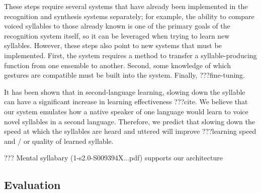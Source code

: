 These steps require several systems
that have already been implemented
in the recognition and synthesis systems separately;
for example, the ability to compare
voiced syllables to those already known
is one of the primary goals of the recognition system itself,
so it can be leveraged when trying to learn new syllables.
However, these steps also point to new systems
that must be implemented.
First, the system requires a method
to transfer a syllable-producing function
from one ensemble to another.
Second, some knowledge of which gestures
are compatible must be built into the system.
Finally, ???fine-tuning.

It has been shown that in second-language learning,
slowing down the syllable can have
a significant increase in learning effectiveness
???cite.
We believe that our system emulates
how a native speaker of one language
would learn to voice novel syllables in a second language.
Therefore, we predict that slowing down
the speed at which the syllables are heard
and uttered will improve ???learning speed
and / or quality of learned syllable.

??? Mental syllabary (1-s2.0-S009394X...pdf)
supports our architecture

\subsection{Evaluation}
